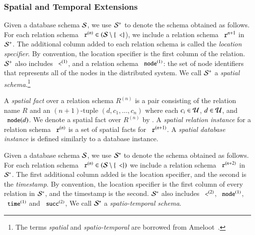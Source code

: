 

\subsubsection{Spatial and Temporal Extensions}
\label{sec:st}

Given a database schema $\schema$, we use $\sschema$ to denote the schema obtained
as follows. For each relation schema $\dedalus{r}^{(n)} \in (\schema \setminus \{\dedalus{<}\}$), we include a relation schema $\dedalus{r}^{n+1}$ in $\sschema$. The
additional column added to each relation schema is called the {\em location specifier}. By convention, the
location specifier is the first column of the relation.
$\sschema$ also includes $\dedalus{<}^{(1)}$, and a relation schema $\dedalus{node}^{(1)}$: the set of node identifiers that represents all of the nodes in the distributed system.
We call $\sschema$ a {\em spatial schema}.\footnote{The terms {\em spatial} and
  {\em spatio-temporal} are borrowed from Ameloot~\cite{ameloot-personal}.}

A {\em spatial fact} over a relation schema $R^{(n)}$ is a pair consisting of the relation name $R$ and an $(n+1)$-tuple $(d,c_1,\ldots,c_n)$ where each $c_i \in \univ$, $d \in \univ$, and $\dedalus{node}(d)$.  We denote a spatial fact over $R^{(n)}$ by .
A {\em spatial relation instance} for a relation schema $\dedalus{r}^{(n)}$ is a set of spatial facts for $\dedalus{r}^{(n+1)}$.
A {\em spatial database instance} is defined similarly to a database instance.

Given a database schema $\schema$, we use $\stschema$ to denote the schema obtained 
as follows. For each relation schema $\dedalus{r}^{(n)} \in (\schema \setminus \{\dedalus{<}\})$ we include a relation schema $\dedalus{r}^{(n+2)}$ in $\stschema$.  The first additional column added is the location specifier, and the second is the {\em timestamp}.  By convention, the location specifier is the first column of every relation in $\stschema$, and the timestamp is the second.  $\stschema$ also includes $\dedalus{<}^{(2)}$, $\dedalus{node}^{(1)}$, $\dedalus{time}^{(1)}$ and $\dedalus{succ}^{(2)}$,   We call $\stschema$ a {\em spatio-temporal schema}.

